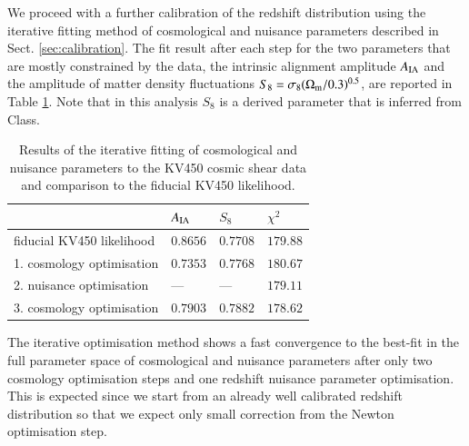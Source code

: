 \documentclass{aa}
\begin{document}
We proceed with a further calibration of the redshift distribution using the iterative fitting method of cosmological and nuisance parameters described in Sect. \ref{sec:calibration}. The fit result after each step for the two parameters that are mostly constrained by the data, the intrinsic alignment amplitude $A_{\rm IA}$ and the amplitude of matter density fluctuations $S_8 = \sigma_8(\Omega_{\rm m}/0.3)^{0.5}$, are reported in Table \ref{tab:iterative_calibration}. Note that in this analysis $S_8$ is a derived parameter that is inferred from {\sc Class}. 
\begin{table}
\caption{Results of the iterative fitting of cosmological and nuisance parameters to the KV450 cosmic shear data and comparison to the fiducial KV450 likelihood.}
\begin{tabular}{llll}
& $A_{\rm IA}$ & $S_8$ & $\chi^2$\\
\hline
\hline
fiducial KV450 likelihood & $0.8656$  & $0.7708$ & $179.88$\\
\hline
1. cosmology optimisation & $0.7353$  & $0.7768$ & $180.67$\\
2. nuisance optimisation & ---  & --- & $179.11$\\
3. cosmology optimisation & $0.7903$  & $0.7882$ & $178.62$\\
\end{tabular}
\label{tab:iterative_calibration}
\end{table}
The iterative optimisation method shows a fast convergence to the best-fit in the full parameter space of cosmological and nuisance parameters after only two cosmology optimisation steps and one redshift nuisance parameter optimisation. This is expected since we start from an already well calibrated redshift distribution so that we expect only small correction from the Newton optimisation step. 
\end{document}
